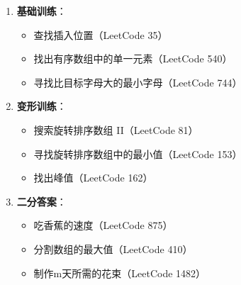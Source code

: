 \documentclass[12pt,a4paper]{article}
\begin{document}
	\begin{enumerate}[leftmargin=*]
		\item \textbf{基础训练}：
		\begin{itemize}
			\item 查找插入位置（LeetCode 35）
			\item 找出有序数组中的单一元素（LeetCode 540）
			\item 寻找比目标字母大的最小字母（LeetCode 744）
		\end{itemize}
		\item \textbf{变形训练}：
		\begin{itemize}
			\item 搜索旋转排序数组 II（LeetCode 81）
			\item 寻找旋转排序数组中的最小值（LeetCode 153）
			\item 找出峰值（LeetCode 162）
		\end{itemize}
		\item \textbf{二分答案}：
		\begin{itemize}
			\item 吃香蕉的速度（LeetCode 875）
			\item 分割数组的最大值（LeetCode 410）
			\item 制作m天所需的花束（LeetCode 1482）
		\end{itemize}
	\end{enumerate}
	
\end{document}
